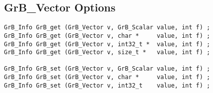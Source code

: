 
\newpage
\subsection{{\sf GrB\_Vector} Options}
\label{get_set_vector}

\begin{mdframed}[userdefinedwidth=6in]
{\footnotesize
\begin{verbatim}
GrB_Info GrB_get (GrB_Vector v, GrB_Scalar value, int f) ;
GrB_Info GrB_get (GrB_Vector v, char *     value, int f) ;
GrB_Info GrB_get (GrB_Vector v, int32_t *  value, int f) ;
GrB_Info GrB_get (GrB_Vector v, size_t *   value, int f) ;

GrB_Info GrB_set (GrB_Vector v, GrB_Scalar value, int f) ;
GrB_Info GrB_set (GrB_Vector v, char *     value, int f) ;
GrB_Info GrB_set (GrB_Vector v, int32_t    value, int f) ;
\end{verbatim}
}\end{mdframed}

